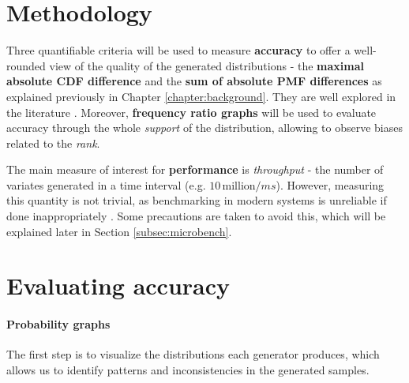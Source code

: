 \section{Methodology}
Three quantifiable criteria will be used to measure \textbf{accuracy} to offer a well-rounded view of the quality of the generated distributions - the \textbf{maximal absolute CDF difference} and the \textbf{sum of absolute PMF differences} as explained
previously in Chapter \ref{chapter:background}. They are well explored in the literature \cite{clausetPowerlawDistributionsEmpirical2009,leydoldErrorDetectionNonUniforma,dengRobustnessNonuniformRandom1992,monahanAccuracyRandomNumber1985}. 
Moreover, \textbf{frequency ratio graphs} will be used to evaluate accuracy through the whole \textit{support} of the distribution, allowing to observe biases related to the \textit{rank}.

The main measure of interest for \textbf{performance} is \textit{throughput} - the number of variates generated in a time interval (e.g. $10 \, \text{million} /ms$). However, measuring this quantity is
not trivial, as benchmarking in modern systems is unreliable if done inappropriately \cite{AvoidingBenchmarkingPitfalls,beyerBenchmarkingResourceMeasurement2015}. Some precautions 
are taken to avoid this, which will be explained later in Section \ref{subsec:microbench}.

\section{Evaluating accuracy}
\paragraph{Probability graphs} The first step is to visualize the distributions each generator produces, which allows us to identify patterns and inconsistencies in the
generated samples.

